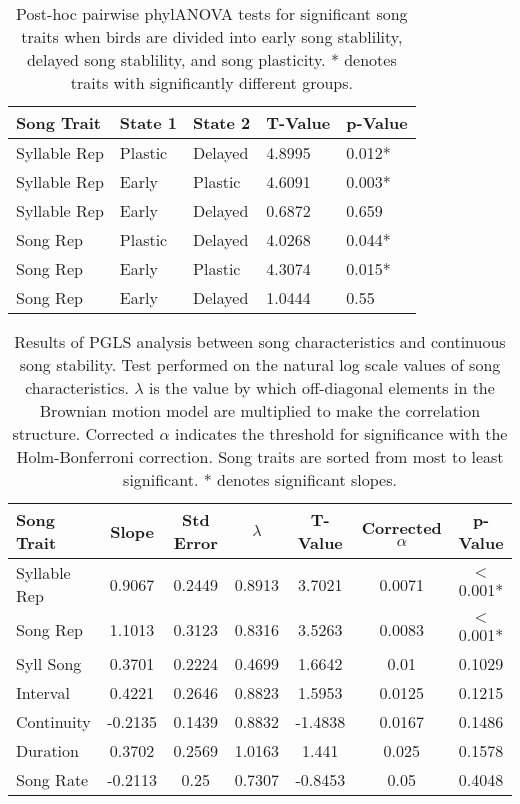 \documentclass[a4paper,12pt]{article}
\begin{document}
\begin{table}[ht]
\caption{Post-hoc pairwise phylANOVA tests for significant song traits when birds are divided into early song stablility, delayed song stablility, and song plasticity.  * denotes traits with significantly different groups.}
\centering
\begin{tabular}{lllll}
  \hline
Song Trait & State 1 & State 2 & T-Value & p-Value \\ 
  \hline
Syllable Rep & Plastic & Delayed & 4.8995 & 0.012* \\ 
  Syllable Rep & Early & Plastic & 4.6091 & 0.003* \\ 
  Syllable Rep & Early & Delayed & 0.6872 & 0.659 \\ \hdashline
  Song Rep & Plastic & Delayed & 4.0268 & 0.044* \\ 
  Song Rep & Early & Plastic & 4.3074 & 0.015* \\ 
  Song Rep & Early & Delayed & 1.0444 & 0.55 \\ 
   \hline
\end{tabular}
\end{table}


\begin{table}[ht]
\caption{Results of PGLS analysis between song characteristics and continuous song stability. Test performed on the natural log scale values of song characteristics. $\lambda$ is the value by which off-diagonal elements in the Brownian motion model are multiplied to make the correlation structure.  Corrected $\alpha$ indicates the threshold for significance with the Holm-Bonferroni correction. Song traits are sorted from most to least significant. * denotes significant slopes.}
\centering
\begin{tabular}{lcccccc}
  \hline
Song Trait & Slope & Std Error & $\lambda$ & T-Value & Corrected $\alpha$ & p-Value \\ 
 \hline
Syllable Rep & 0.9067 & 0.2449 & 0.8913 & 3.7021 & 0.0071 & $<$0.001* \\ 
  Song Rep & 1.1013 & 0.3123 & 0.8316 & 3.5263 & 0.0083 & $<$0.001* \\ 
  Syll Song & 0.3701 & 0.2224 & 0.4699 & 1.6642 & 0.01 & 0.1029 \\ 
  Interval & 0.4221 & 0.2646 & 0.8823 & 1.5953 & 0.0125 & 0.1215 \\ 
  Continuity & -0.2135 & 0.1439 & 0.8832 & -1.4838 & 0.0167 & 0.1486 \\ 
  Duration & 0.3702 & 0.2569 & 1.0163 & 1.441 & 0.025 & 0.1578 \\ 
  Song Rate & -0.2113 & 0.25 & 0.7307 & -0.8453 & 0.05 & 0.4048 \\ 
   \hline
\end{tabular}
\end{table}
\end{document}
